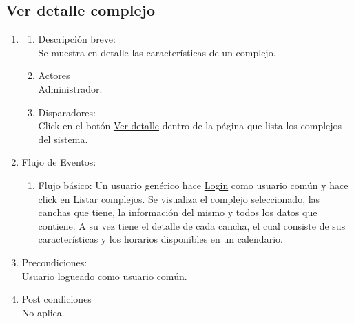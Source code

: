 \documentclass[a4paper,11pt]{article}
\begin{document}
\subsection{Ver detalle complejo}
\begin{enumerate}

    \item
    \begin{enumerate}
    \item Descripción breve: \\
        Se muestra en detalle las características de un complejo.
    \item Actores \\
        Administrador.
    \item Disparadores: \\
        Click en el botón \underline{Ver detalle} dentro de la
        página que lista los complejos del sistema.
    \end{enumerate}

    \item Flujo de Eventos:

    \begin{enumerate}

        \item Flujo básico:
            Un usuario genérico hace \underline{Login} como usuario común y
            hace click en \underline{Listar complejos}. Se visualiza el
            complejo seleccionado, las canchas que tiene, la información del
            mismo y todos los datos que contiene. A su vez tiene el detalle de
            cada cancha, el cual consiste de sus características y los horarios
            disponibles en un calendario.


    \end{enumerate}

    \item Precondiciones: \\
        Usuario logueado como usuario común.

    \item Post condiciones \\
        No aplica.

\end{enumerate}
\end{document}
